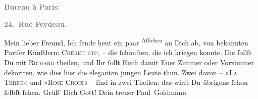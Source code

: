 \begin{ledgroupsized}[t]{13cm}
           \pstart
           \begin{otherlanguage}{french}\textcolor{gray}{\textbf{\textbf{Bureau à Paris:}}}\end{otherlanguage}\pend
           \pstart
           \begin{otherlanguage}{french}\textcolor{gray}{\textbf{\textbf{24. Rue Feydeau.}}}\end{otherlanguage}\pend
           \pstart\center{}Mein lieber Freund,\pend\pstart
           Ich ſende heut ein paar \substVorne{}\textsuperscript{Affichen}{\allowbreak}\substDazwischen{}\label{K_L02730-1v}\label{K_L02730-1h}\substHinten{} an Dich ab, von bekannten Pariſer
               Künſtlern: \textsc{Chéret}{ }\textsc{etc}, – die ſchönſten, die ich kriegen konnte. Die ſollſt Du
               mit \textsc{Richard} theilen, und Ihr ſollt Euch damit Euer Zimmer oder Vorzimmer dekoriren, wie
               dies hier die eleganten jungen Leute thun. Zwei davon – »\textsc{La Terre}« und »\textsc{Rose Croix}« – ſind in zwei Theilen; das wirſt Du übrigens ſchon ſelbſt ſehen. Grüß’ Dich
               Gott! Dein treuer\pend
           \pstart \spacefill\mbox{Paul Goldmann}\pend{}
         
         \endnumbering{}\end{ledgroupsized}  \newcommand{\dateiname}{L02730}\newcommand{\titel}{Paul Goldmann an Arthur Schnitzler, 7. 3. [1895]}\newcommand{\editorInnen}{Martin Anton Müller und Laura Untner}
      
